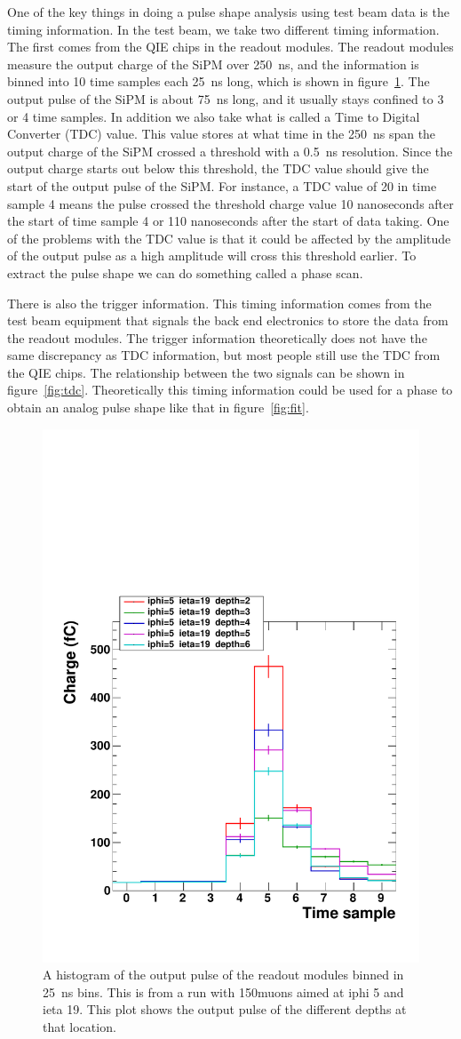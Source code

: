 One of the key things in doing a pulse shape analysis using test beam data is the timing information. In the test beam, we take two different timing information. The first comes from the QIE chips in the readout modules. The readout modules measure the output charge of the SiPM over 250~ns, and the information is binned into 10 time samples each 25~ns long, which is shown in figure~\ref{fig:PulSh}. The output pulse of the SiPM is about 75~ns long, and it usually stays confined to 3 or 4 time samples. In addition we also take what is called a Time to Digital Converter (TDC) value. This value stores at what time in the 250~ns span the output charge of the SiPM crossed a threshold with a 0.5~ns resolution. Since the output charge starts out below this threshold, the TDC value should give the start of the output pulse of the SiPM. For instance, a TDC value of 20 in time sample 4 means the pulse crossed the threshold charge value 10 nanoseconds after the start of time sample 4 or 110 nanoseconds after the start of data taking. One of the problems with the TDC value is that it could be affected by the amplitude of the output pulse as a high amplitude will cross this threshold earlier. To extract the pulse shape we can do something called a phase scan. 

There is also the trigger information. This timing information comes from the test beam equipment that signals the back end electronics to store the data from the readout modules. The trigger information theoretically does not have the same discrepancy as TDC information, but most people still use the TDC from the QIE chips. The relationship between the two signals can be shown in figure~\ref{fig:tdc}. Theoretically this timing information could be used for a phase to obtain an analog pulse shape like that in figure~\ref{fig:fit}.

\begin{figure}
\centering
\includegraphics[width=0.6\linewidth]{Figures/Pulse.pdf}
\caption{A histogram of the output pulse of the readout modules binned in 25~ns bins. This is from a run with 150\GeV\space muons aimed at iphi 5 and ieta 19. This plot shows the output pulse of the different depths at that location.}
\label{fig:PulSh}
\end{figure}

